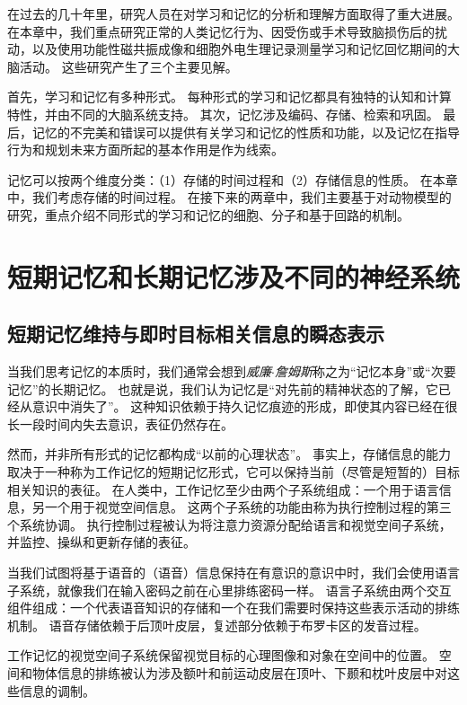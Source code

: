 在过去的几十年里，研究人员在对学习和记忆的分析和理解方面取得了重大进展。
在本章中，我们重点研究正常的人类记忆行为、因受伤或手术导致脑损伤后的扰动，以及使用功能性磁共振成像和细胞外电生理记录测量学习和记忆回忆期间的大脑活动。
这些研究产生了三个主要见解。


首先，学习和记忆有多种形式。
每种形式的学习和记忆都具有独特的认知和计算特性，并由不同的大脑系统支持。
其次，记忆涉及编码、存储、检索和巩固。
最后，记忆的不完美和错误可以提供有关学习和记忆的性质和功能，以及记忆在指导行为和规划未来方面所起的基本作用是作为线索。


记忆可以按两个维度分类：（1）存储的时间过程和（2）存储信息的性质。
在本章中，我们考虑存储的时间过程。
在接下来的两章中，我们主要基于对动物模型的研究，重点介绍不同形式的学习和记忆的细胞、分子和基于回路的机制。



\section{短期记忆和长期记忆涉及不同的神经系统}

\subsection{短期记忆维持与即时目标相关信息的瞬态表示}

当我们思考记忆的本质时，我们通常会想到\textit{威廉$\cdot$詹姆斯}称之为“记忆本身”或“次要记忆”的长期记忆。
也就是说，我们认为记忆是“对先前的精神状态的了解，它已经从意识中消失了”。
这种知识依赖于持久记忆痕迹的形成，即使其内容已经在很长一段时间内失去意识，表征仍然存在。


然而，并非所有形式的记忆都构成“以前的心理状态”。
事实上，存储信息的能力取决于一种称为工作记忆的短期记忆形式，它可以保持当前（尽管是短暂的）目标相关知识的表征。
在人类中，工作记忆至少由两个子系统组成：一个用于语言信息，另一个用于视觉空间信息。
这两个子系统的功能由称为执行控制过程的第三个系统协调。
执行控制过程被认为将注意力资源分配给语言和视觉空间子系统，并监控、操纵和更新存储的表征。


当我们试图将基于语音的（语音）信息保持在有意识的意识中时，我们会使用语言子系统，就像我们在输入密码之前在心里排练密码一样。
语言子系统由两个交互组件组成：一个代表语音知识的存储和一个在我们需要时保持这些表示活动的排练机制。
语音存储依赖于后顶叶皮层，复述部分依赖于布罗卡区的发音过程。


工作记忆的视觉空间子系统保留视觉目标的心理图像和对象在空间中的位置。
空间和物体信息的排练被认为涉及额叶和前运动皮层在顶叶、下颞和枕叶皮层中对这些信息的调制。



